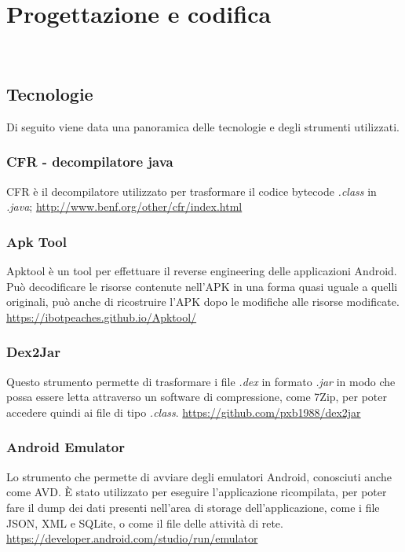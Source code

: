 
\chapter{Progettazione e codifica}
\label{ch:progettazione-e-codifica}

\\

\section{Tecnologie}
\label{sec:tecnologie}

Di seguito viene data una panoramica delle tecnologie e degli strumenti utilizzati.

\subsection*{CFR - decompilatore java}
CFR è il decompilatore utilizzato per trasformare il codice bytecode \textit{.class} in \textit{.java};
\url{http://www.benf.org/other/cfr/index.html}

\subsection*{Apk Tool}
Apktool è un tool per effettuare il reverse engineering delle applicazioni Android. Può decodificare le risorse contenute nell'APK in una forma quasi uguale a quelli originali, può anche di ricostruire l'APK dopo le modifiche alle risorse modificate.
\url{https://ibotpeaches.github.io/Apktool/}
\subsection*{Dex2Jar}
Questo strumento permette di trasformare i file \textit{.dex} in formato \textit{.jar} in modo che possa essere letta attraverso un software di compressione, come 7Zip, per poter accedere quindi ai file di tipo \textit{.class}.
\url{https://github.com/pxb1988/dex2jar}

\subsection*{Android Emulator}
Lo strumento che permette di avviare degli emulatori Android, conosciuti anche come AVD. È stato utilizzato per eseguire l'applicazione ricompilata, per poter fare il dump dei dati presenti nell'area di storage dell'applicazione, come i file JSON, XML e SQLite, o come il file delle attività di rete.
\url{https://developer.android.com/studio/run/emulator}
